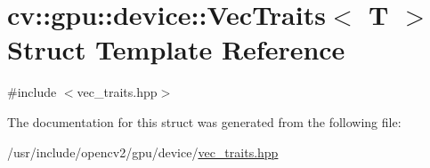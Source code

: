 \hypertarget{structcv_1_1gpu_1_1device_1_1VecTraits}{\section{cv\-:\-:gpu\-:\-:device\-:\-:Vec\-Traits$<$ T $>$ Struct Template Reference}
\label{structcv_1_1gpu_1_1device_1_1VecTraits}
}


{\ttfamily \#include $<$vec\-\_\-traits.\-hpp$>$}



The documentation for this struct was generated from the following file\-:\begin{DoxyCompactItemize}
\item 
/usr/include/opencv2/gpu/device/\hyperlink{vec__traits_8hpp}{vec\-\_\-traits.\-hpp}\end{DoxyCompactItemize}
